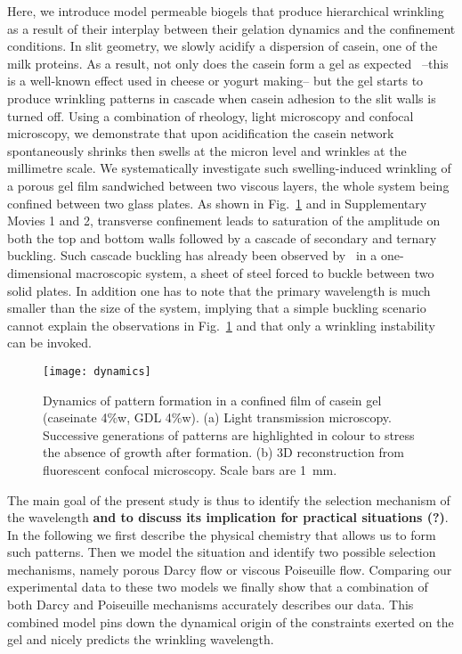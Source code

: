 \documentclass[twocolumn,superscriptaddress,showpacs,preprintnumbers,
amsmath,amssymb,prl]{revtex4-1}
\newcommand{\seb}[1]{\textbf{\color{blue}#1}} %
\begin{document}
Here, we introduce model permeable biogels that produce hierarchical wrinkling as a result of their interplay between their gelation dynamics and the confinement conditions. In slit geometry, we slowly acidify a dispersion of casein, one of the milk proteins.  As a result, not only does the casein form a gel as expected~\cite{Bremer1989} --this is a well-known effect used in cheese or yogurt making-- but the gel starts to produce wrinkling patterns in cascade when casein adhesion to the slit walls is turned off. Using a combination of rheology, light microscopy and confocal microscopy, we demonstrate that upon acidification the casein network spontaneously shrinks then swells at the micron level and wrinkles at the millimetre scale. We systematically investigate such swelling-induced wrinkling of a porous gel film sandwiched between two viscous layers, the whole system being confined between two glass plates. As shown in Fig.~\ref{fig:dynamics} and in Supplementary Movies 1 and 2, transverse confinement leads to saturation of the amplitude on both the top and bottom walls followed by a cascade of secondary and ternary buckling. Such cascade buckling has already been observed by~\cite{Roman1999} in a one-dimensional macroscopic system, a sheet of steel forced to buckle between two solid plates. In addition one has to note that the primary wavelength is much smaller than the size of the system, implying that a simple buckling scenario cannot explain the observations in Fig.~\ref{fig:dynamics} and that only a wrinkling instability can be invoked. 

\begin{figure}[ht!]
	\texttt{[image: dynamics]}%
	\caption{Dynamics of pattern formation in a confined film of casein gel (caseinate 4\%w, GDL 4\%w). (a) Light transmission microscopy. Successive generations of patterns are highlighted in colour to stress the absence of growth after formation. (b) 3D reconstruction from fluorescent confocal microscopy. Scale bars are \SI{1}{\milli\metre}.}%
	\label{fig:dynamics}%
\end{figure}

The main goal of the present study is thus to identify the selection mechanism of the wavelength \seb{and to discuss its implication for practical situations (?)}. In the following we first describe the physical chemistry that allows us to form such patterns. Then we  model the situation and identify two possible selection mechanisms, namely porous Darcy flow or viscous Poiseuille flow. Comparing our experimental data to these two models we finally show that a combination of both Darcy and Poiseuille mechanisms accurately describes our data. This combined model pins down the dynamical origin of the constraints exerted on the gel and nicely predicts the wrinkling wavelength.
\end{document}
